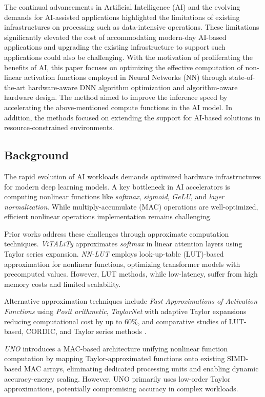 \documentclass[runningheads]{llncs}
\begin{document}
The continual advancements in Artificial Intelligence (AI) and the evolving demands for AI-assisted applications highlighted the limitations of existing infrastructures on processing such as data-intensive operations. These limitations significantly elevated the cost of accommodating modern-day AI-based applications and upgrading the existing infrastructure to support such applications could also be challenging. With the motivation of proliferating the benefits of AI, this paper focuses on optimizing the effective computation of non-linear activation functions employed in Neural Networks (NN) through state-of-the-art hardware-aware DNN algorithm optimization and algorithm-aware hardware design. The method aimed to improve the inference speed by accelerating the above-mentioned compute functions in the AI model. In addition, the methods focused on extending the support for AI-based solutions in resource-constrained environments.

\subsection{Background}

The rapid evolution of AI workloads demands optimized hardware infrastructures for modern deep learning models. A key bottleneck in AI accelerators is computing nonlinear functions like \textit{softmax}, \textit{sigmoid}, \textit{GeLU}, and \textit{layer normalization}. While multiply-accumulate (MAC) operations are well-optimized, efficient nonlinear operations implementation remains challenging.

Prior works address these challenges through approximate computation techniques. \textit{ViTALiTy} \cite{10071081} approximates \textit{softmax} in linear attention layers using Taylor series expansion. \textit{NN-LUT} \cite{10.1145/3489517.3530505} employs look-up-table (LUT)-based approximation for nonlinear functions, optimizing transformer models with precomputed values. However, LUT methods, while low-latency, suffer from high memory costs and limited scalability. 

Alternative approximation techniques include \textit{Fast Approximations of Activation Functions} \cite{fastapprox2021posit} using \textit{Posit arithmetic}, \textit{TaylorNet} \cite{taylornet2020approx} with adaptive Taylor expansions reducing computational cost by up to 60\%, and comparative studies of LUT-based, CORDIC, and Taylor series methods \cite{approxactivation2022}.

\textit{UNO} \cite{9502473,wu2021uno} introduces a MAC-based architecture unifying nonlinear function computation by mapping Taylor-approximated functions onto existing SIMD-based MAC arrays, eliminating dedicated processing units and enabling dynamic accuracy-energy scaling. However, UNO primarily uses low-order Taylor approximations, potentially compromising accuracy in complex workloads.
\end{document}
